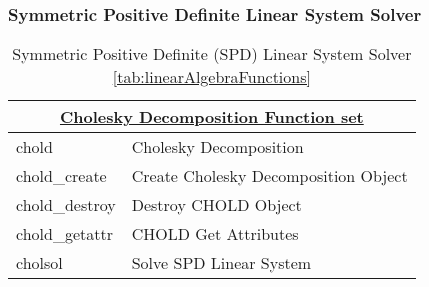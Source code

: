 \subsubsection*{Symmetric Positive Definite Linear System Solver} 
\begin{table}[H]
\caption{Symmetric Positive Definite (SPD) Linear System Solver  \ref{tab:linearAlgebraFunctions}}
\label{tab:symmetricPositiveDefiniteSolvers}
\begin{center}
\begin{tabular}{|l|l|}
\multicolumn{2}{c}{\hyperlink{choldFunc}{\rmfamily \bfseries Cholesky Decomposition Function set}}\\
\hline
chold & Cholesky Decomposition\\
chold\_create & Create Cholesky Decomposition Object\\
chold\_destroy & Destroy CHOLD Object\\
chold\_getattr & CHOLD Get Attributes\\
cholsol & Solve SPD Linear System\\
\hline\end{tabular}
\end{center}
\label{default}
\end{table}%